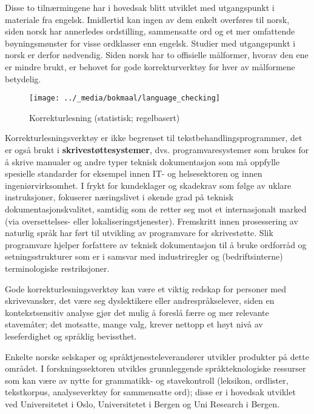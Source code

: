 \begin{multicols}{2}
Disse to tilnærmingene har i hovedsak blitt utviklet med utgangspunkt i materiale fra engelsk. Imidlertid kan ingen av dem enkelt overføres til norsk, siden norsk har annerledes ordstilling, sammensatte ord og et mer omfattende bøyningsmønster for visse ordklasser enn engelsk. Studier med utgangspunkt i norsk er derfor nødvendig. Siden norsk har to offisielle målformer, hvorav den ene er mindre brukt, er behovet for gode korrekturverktøy for hver av målformene betydelig.

\begin{figure*}[htb]
  \center
  \texttt{[image: ../\_media/bokmaal/language\_checking]}
  \caption{Korrekturlesning (statistisk; regelbasert)}
  \label{fig:langcheckingaarch_no}
\end{figure*}

Korrekturlesningsverktøy er ikke begrenset til tekstbehandlingsprogrammer, det er også brukt i \textbf{skrivestøttesystemer}, dvs. programvaresystemer som brukes for å skrive manualer og andre typer teknisk dokumentasjon som må oppfylle spesielle standarder for eksempel innen IT- og helsesektoren og innen ingeniørvirksomhet. I frykt for kundeklager og skadekrav som følge av uklare instruksjoner, fokuserer næringslivet i økende grad på teknisk dokumentasjonskvalitet, samtidig som de retter seg mot et internasjonalt marked (via oversettelses- eller lokaliseringstjenester). Fremskritt innen prosessering av naturlig språk har ført til utvikling av programvare for skrivestøtte. Slik programvare hjelper forfattere av teknisk dokumentasjon til å bruke ordforråd og setningsstrukturer som er i samsvar med industriregler og (bedriftsinterne) terminologiske restriksjoner.


Gode korrekturlesningsverktøy kan være et viktig redskap for personer med skrivevansker, det være seg dyslektikere eller andrespråkselever, siden en kontekstsensitiv analyse gjør det mulig å foreslå færre og mer relevante stavemåter; det motsatte, mange valg, krever nettopp et høyt nivå av leseferdighet og språklig bevissthet.

Enkelte norske selskaper og språktjenesteleverandører utvikler produkter på dette området. 
I forskningssektoren utvikles grunnleggende språkteknologiske ressurser som kan være av nytte for grammatikk- og stavekontroll (leksikon, ordlister, tekstkorpus, analyseverktøy for sammensatte ord); disse er i hovedsak utviklet ved Universitetet i Oslo, Universitetet i Bergen og Uni Research i Bergen.


\end{multicols}
